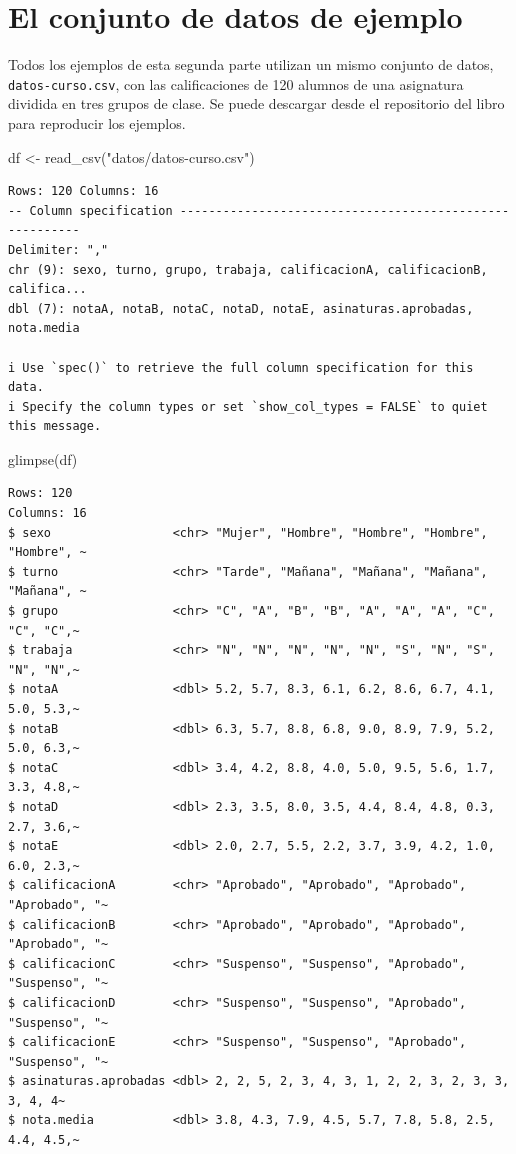 \documentclass[
  spanish,
  a4paper,
]{scrreport}
\newenvironment{Shaded}{\begin{snugshade}}{\end{snugshade}}
\newcommand{\FunctionTok}[1]{\textcolor[rgb]{0.28,0.35,0.67}{#1}}
\newcommand{\NormalTok}[1]{\textcolor[rgb]{0.00,0.23,0.31}{#1}}
\newcommand{\OtherTok}[1]{\textcolor[rgb]{0.00,0.23,0.31}{#1}}
\newcommand{\StringTok}[1]{\textcolor[rgb]{0.13,0.47,0.30}{#1}}
\theoremstyle{definition}
\theoremstyle{definition}
\theoremstyle{remark}
\begin{document}
\section{El conjunto de datos de
ejemplo}\label{el-conjunto-de-datos-de-ejemplo}

Todos los ejemplos de esta segunda parte utilizan un mismo conjunto de
datos, \texttt{datos-curso.csv}, con las calificaciones de 120 alumnos
de una asignatura dividida en tres grupos de clase. Se puede descargar
desde el repositorio del libro para reproducir los ejemplos.

\begin{Shaded}
\begin{Highlighting}[]
\NormalTok{df }\OtherTok{\textless{}{-}} \FunctionTok{read\_csv}\NormalTok{(}\StringTok{"datos/datos{-}curso.csv"}\NormalTok{)}
\end{Highlighting}
\end{Shaded}

\begin{verbatim}
Rows: 120 Columns: 16
-- Column specification --------------------------------------------------------
Delimiter: ","
chr (9): sexo, turno, grupo, trabaja, calificacionA, calificacionB, califica...
dbl (7): notaA, notaB, notaC, notaD, notaE, asinaturas.aprobadas, nota.media

i Use `spec()` to retrieve the full column specification for this data.
i Specify the column types or set `show_col_types = FALSE` to quiet this message.
\end{verbatim}

\begin{Shaded}
\begin{Highlighting}[]
\FunctionTok{glimpse}\NormalTok{(df)}
\end{Highlighting}
\end{Shaded}

\begin{verbatim}
Rows: 120
Columns: 16
$ sexo                 <chr> "Mujer", "Hombre", "Hombre", "Hombre", "Hombre", ~
$ turno                <chr> "Tarde", "Mañana", "Mañana", "Mañana", "Mañana", ~
$ grupo                <chr> "C", "A", "B", "B", "A", "A", "A", "C", "C", "C",~
$ trabaja              <chr> "N", "N", "N", "N", "N", "S", "N", "S", "N", "N",~
$ notaA                <dbl> 5.2, 5.7, 8.3, 6.1, 6.2, 8.6, 6.7, 4.1, 5.0, 5.3,~
$ notaB                <dbl> 6.3, 5.7, 8.8, 6.8, 9.0, 8.9, 7.9, 5.2, 5.0, 6.3,~
$ notaC                <dbl> 3.4, 4.2, 8.8, 4.0, 5.0, 9.5, 5.6, 1.7, 3.3, 4.8,~
$ notaD                <dbl> 2.3, 3.5, 8.0, 3.5, 4.4, 8.4, 4.8, 0.3, 2.7, 3.6,~
$ notaE                <dbl> 2.0, 2.7, 5.5, 2.2, 3.7, 3.9, 4.2, 1.0, 6.0, 2.3,~
$ calificacionA        <chr> "Aprobado", "Aprobado", "Aprobado", "Aprobado", "~
$ calificacionB        <chr> "Aprobado", "Aprobado", "Aprobado", "Aprobado", "~
$ calificacionC        <chr> "Suspenso", "Suspenso", "Aprobado", "Suspenso", "~
$ calificacionD        <chr> "Suspenso", "Suspenso", "Aprobado", "Suspenso", "~
$ calificacionE        <chr> "Suspenso", "Suspenso", "Aprobado", "Suspenso", "~
$ asinaturas.aprobadas <dbl> 2, 2, 5, 2, 3, 4, 3, 1, 2, 2, 3, 2, 3, 3, 3, 4, 4~
$ nota.media           <dbl> 3.8, 4.3, 7.9, 4.5, 5.7, 7.8, 5.8, 2.5, 4.4, 4.5,~
\end{verbatim}
\end{document}

